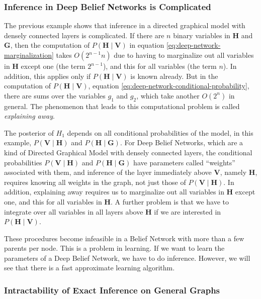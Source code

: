 \subsubsection{Inference in Deep Belief Networks is Complicated\label{par:Exact-Inference-in-Deep-Belief-Networks-is-Complicated}}

The previous example shows that inference in a directed graphical
model with densely connected layers is complicated. If there are $n$
binary variables in $\mathbf{H}$ and $\mathbf{G}$, then the computation
of $P(\mathbf{H}\mid\mathbf{V})$ in equation \ref{eq:deep-network-marginalization}
takes $O(2^{n-1}n)$ due to having to marginalize out all variables
in $\mathbf{H}$ except one (the term $2^{n-1}$), and this for all
variables (the term $n$). In addition, this applies only if $P(\mathbf{H}\mid\mathbf{V})$
is known already. But in the computation of $P(\mathbf{H}\mid\mathbf{V})$,
equation \ref{eq:deep-network-conditional-probability}, there are
sums over the variables $g_{1}$ and $g_{2}$, which take another
$O(2^{n})$ in general. The phenomenon that leads to this computational
problem is called \emph{explaining away}.

The posterior of $H_{1}$ depends on all conditional probabilities
of the model, in this example, $P(\mathbf{V}\mid\mathbf{H})$ and
$P(\mathbf{H}\mid\mathbf{G})$. For Deep Belief Networks, which are
a kind of Directed Graphical Model with densely connected layers,
the conditional probabilities $P(\mathbf{V}\mid\mathbf{H})$ and $P(\mathbf{H}\mid\mathbf{G})$
have parameters called ``weights'' associated with them, and inference
of the layer immediately above $\mathbf{V}$, namely $\mathbf{H}$,
requires knowing all weights in the graph, not just those of $P(\mathbf{V}\mid\mathbf{H})$.
In addition, explaining away requires us to marginalize out all variables
in $\mathbf{H}$ except one, and this for all variables in $\mathbf{H}$.
A further problem is that we have to integrate over all variables
in all layers above $\mathbf{H}$ if we are interested in $P(\mathbf{H}\mid\mathbf{V})$.

These procedures become infeasible in a Belief Network with more than
a few parents per node. This is a problem in learning. If we want
to learn the parameters of a Deep Belief Network, we have to do inference.
However, we will see that there is a fast approximate learning algorithm.

\subsubsection{Intractability of Exact Inference on General Graphs}

